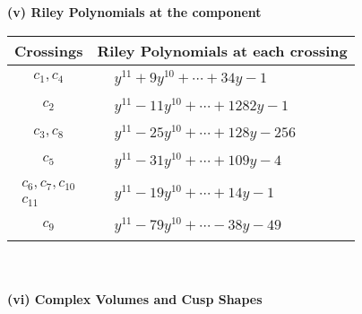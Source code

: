 \documentclass[1p]{elsarticle_modified}
\theoremstyle{definition}
\begin{document}
\newpage\renewcommand{\arraystretch}{1}
\flushleft \textbf{(v) Riley Polynomials at the component}\newline \\
\begin{tabular}{m{50pt}|m{274pt}}
Crossings & \hspace{64pt}Riley Polynomials at each crossing \\
\hline $$\begin{aligned}c_{1},c_{4}\end{aligned}$$&$\begin{aligned}
&y^{11}+9 y^{10}+\cdots+34 y-1
\end{aligned}$\\
\hline $$\begin{aligned}c_{2}\end{aligned}$$&$\begin{aligned}
&y^{11}-11 y^{10}+\cdots+1282 y-1
\end{aligned}$\\
\hline $$\begin{aligned}c_{3},c_{8}\end{aligned}$$&$\begin{aligned}
&y^{11}-25 y^{10}+\cdots+128 y-256
\end{aligned}$\\
\hline $$\begin{aligned}c_{5}\end{aligned}$$&$\begin{aligned}
&y^{11}-31 y^{10}+\cdots+109 y-4
\end{aligned}$\\
\hline $$\begin{aligned}c_{6},c_{7},c_{10}\\c_{11}\end{aligned}$$&$\begin{aligned}
&y^{11}-19 y^{10}+\cdots+14 y-1
\end{aligned}$\\
\hline $$\begin{aligned}c_{9}\end{aligned}$$&$\begin{aligned}
&y^{11}-79 y^{10}+\cdots-38 y-49
\end{aligned}$\\
\hline
\end{tabular}\\~\\
\newpage\flushleft \textbf{(vi) Complex Volumes and Cusp Shapes}
\end{document}
